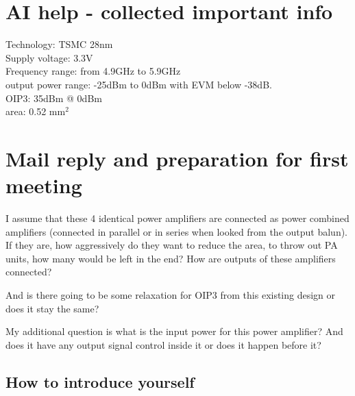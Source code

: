 \documentclass{article}
\begin{document}
\section{AI help - collected important info}

Technology: TSMC 28nm \\
Supply voltage: 3.3V \\
Frequency range: from 4.9GHz to 5.9GHz \\
output power range: -25dBm to 0dBm with EVM below -38dB. \\
OIP3: 35dBm @ 0dBm \\ %
area: 0.52 mm$^2$

\section{Mail reply and preparation for first meeting}

I assume that these 4 identical power amplifiers are connected as power combined amplifiers (connected in parallel or in series when looked from the output balun). If they are, how aggressively do they want to reduce the area, to throw out PA units, how many would be left in the end? How are outputs of these amplifiers connected? %




And is there going to be some relaxation for OIP3 from this existing design or does it stay the same?

My additional question is what is the input power for this power amplifier? And does it have any output signal control inside it or does it happen before it?



\subsection{How to introduce yourself}
\end{document}
